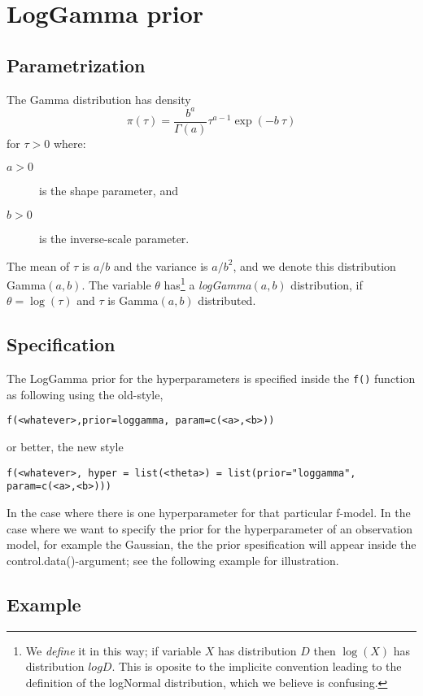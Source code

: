 \documentclass[a4paper,11pt]{article}
\begin{document}
\section*{LogGamma prior}

\subsection*{Parametrization}
The Gamma  distribution has density
\begin{equation}
    \pi(\tau)=\frac{b^a}{\Gamma(a)}\tau^{a-1}\exp(-b\ \tau)
\end{equation}
for $\tau>0$ where:
\begin{description}
\item[$a>0$] is the shape parameter, and
\item[$b>0$] is the inverse-scale parameter.
\end{description}
The mean of $\tau$ is $a/b$ and the variance is $a/b^2$, and we denote
this distribution  Gamma$(a,b)$.  The variable $\theta$
has\footnote{We \emph{define} it in this way; if variable $X$ has
    distribution $D$ then $\log(X)$ has distribution $logD$. This is
    oposite to the implicite convention leading to the definition of
    the logNormal distribution, which we believe is confusing.}  a
\emph{logGamma}$(a,b)$ distribution, if $\theta=\log(\tau)$ and $\tau$
is Gamma$(a,b)$ distributed.

\subsection*{Specification}
The LogGamma prior for the hyperparameters is specified inside the
{\tt f()} function as following using the old-style,
\begin{center}
    {\tt f(<whatever>,prior=loggamma, param=c(<a>,<b>))}
\end{center}
or better, the new style
\begin{center}
    {\tt f(<whatever>, hyper = list(<theta>) =
        list(prior="loggamma", param=c(<a>,<b>)))}
\end{center}
In the case where there is one hyperparameter for that particular
f-model. In the case where we want to specify the prior for the
hyperparameter of an observation model, for example the
Gaussian, the the prior spesification will appear inside the
control.data()-argument; see the following example for illustration.

\subsection*{Example}
\end{document}
